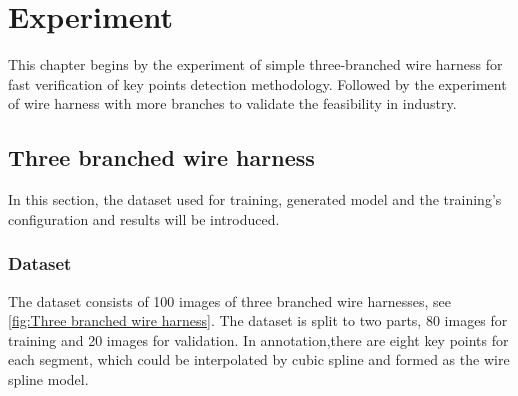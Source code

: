 \chapter{Experiment}
This chapter begins by the experiment of simple three-branched wire harness for fast verification of key points detection methodology.
Followed by the experiment of wire harness with more branches to validate the feasibility in industry.
\section{Three branched wire harness}
In this section, the dataset used for training, generated model and the training's configuration and results will be introduced.
\subsection{Dataset}
The dataset consists of 100 images of three branched wire harnesses, see \autoref{fig:Three branched wire harness}. The dataset is split to 
two parts, 80 images for training and 20 images for validation.
In annotation,there are eight key points for each segment, which could be interpolated by cubic spline and formed as the wire spline model.
